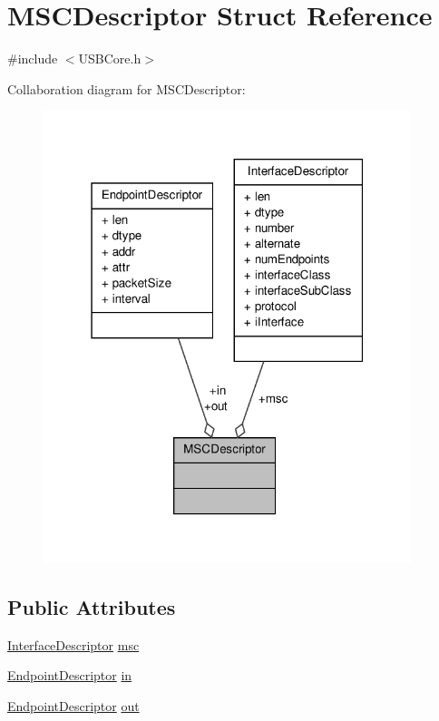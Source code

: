\hypertarget{struct_m_s_c_descriptor}{\section{M\-S\-C\-Descriptor Struct Reference}
\label{struct_m_s_c_descriptor}
}


{\ttfamily \#include $<$U\-S\-B\-Core.\-h$>$}



Collaboration diagram for M\-S\-C\-Descriptor\-:
\nopagebreak
\begin{figure}[H]
\begin{center}
\leavevmode
\includegraphics[width=304pt]{struct_m_s_c_descriptor__coll__graph}
\end{center}
\end{figure}
\subsection*{Public Attributes}
\begin{DoxyCompactItemize}
\item 
\hyperlink{struct_interface_descriptor}{Interface\-Descriptor} \hyperlink{struct_m_s_c_descriptor_ad1df90234c1714bd3ffa34c0a28d4621}{msc}
\item 
\hyperlink{struct_endpoint_descriptor}{Endpoint\-Descriptor} \hyperlink{struct_m_s_c_descriptor_a9ae4c4c01f7b1f9ed6c16bbd8793dfd9}{in}
\item 
\hyperlink{struct_endpoint_descriptor}{Endpoint\-Descriptor} \hyperlink{struct_m_s_c_descriptor_a2e9b0bbe81b8b510cd182c70560c33eb}{out}
\end{DoxyCompactItemize}


